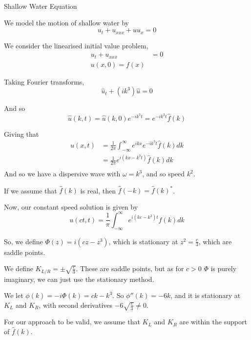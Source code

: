 \documentclass[a4paper]{article}
\begin{document}
\begin{eg} Shallow Water Equation
	
	We model the motion of shallow water by
	\[
		u_t + u_{x x x} + u u_x = 0  
	\]

	We consider the linearised initial value problem,
	\begin{align*}
		u_t + u_{x x x } &= 0 \\
		u(x,0) = f(x)
	\end{align*}

	Taking Fourier transforms,
	 \[
		 \hat{u}_t + (ik^3) \hat{u} = 0
	\]

	And so
	\[
		\hat{u}(k, t) = \hat{u}(k, 0) e^{-ik^3t} = e^{-ik^3 t} \hat{f}(k)
	\]

	Giving that
	\begin{align*}
		u(x,t) &= \frac{1}{2\pi} \int_{-\infty}^{\infty} e^{ikx} e^{-ik^3t} \hat{f}(k) dk \\
		&= \frac{1}{2\pi} e^{i(kx - k^3 t)} \hat{f}(k) dk\\
	\end{align*}
	And so we have a dispersive wave with $\omega = k^3$, and so speed  $k^2$.
	
	If we assume that $\hat{f}(k)$ is real, then $\hat{f}(-k) = \hat{f}(k)^{\ast}$.

	Now, our constant speed solution is given by
	\[
		u(ct, t) = \frac{1}{\pi} \int_{-\infty}^{\infty} e^{i(kc - k^3)t} \hat{f}(k) dk
	\]

	So, we define $\Phi(z) = i(cz - z^3)$, which is stationary at $z^2 = \frac{c}{3}$, which are saddle points.

	We define $K_{L / R} = \pm \sqrt{\frac{c}{3}} $. These are saddle points, but as for $c>0$  $\Phi$ is purely imaginary, we can just use the stationary method.

	We let $\phi(k) = -i\Phi(k) = ck - k^3$. So $\phi''(k) = -6k$, and it is stationary at  $K_L$ and $K_R$, with second derivatives  $-6\sqrt{\frac{c}{3}} \neq 0 $.

	For our approach to be valid, we assume that $K_ L$ and $K_R$ are within the support of $\hat{f}(k)$. 



\end{eg}
\end{document}
